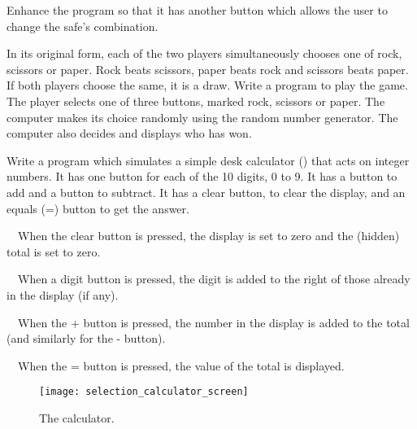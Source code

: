 \begin{EXE}
				Enhance the program so that it has another button which allows the user to change the safe's combination.
			\item	{} In its original form, each of the two players simultaneously chooses one of rock, scissors or paper. Rock beats scissors, paper beats rock and scissors beats paper. If both players choose the same, it is a draw. Write a program to play the game. The player selects one of three buttons, marked rock, scissors or paper. The computer makes its choice randomly using the random number generator. The computer also decides and displays who has won.
			\item	{} Write a program which simulates a simple desk calculator () that acts on integer numbers. It has one button for each of the 10 digits, 0 to 9. It has a button to add and a button to subtract. It has a clear button, to clear the display, and an equals (=) button to get the answer.

			  When the clear button is pressed, the display is set to zero and the (hidden) total is set to zero.

			  When a digit button is pressed, the digit is added to the right of those already in the display (if any).

			  When the + button is pressed, the number in the display is added to the total (and similarly for the - button).

			  When the = button is pressed, the value of the total is displayed.

			
		\begin{figure}[th]
			\centering
			\texttt{[image: selection\_calculator\_screen]}
			\caption{The calculator.}
			\label{fig:selection_calculator_screen}
		\end{figure}


\end{EXE}
